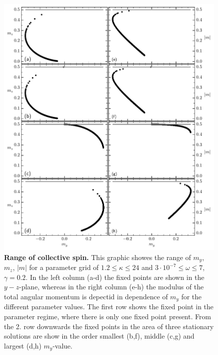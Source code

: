     \begin{figure}[H]
        \hspace*{-0.4cm}
        \includegraphics[scale=0.97]{pictures/fixp_boundaries.pdf}
        \caption{\textbf{Range of collective spin.} This graphic showes the range of $m_y$, $m_z$, $|m|$ for a parameter grid of $1.2\leq\kappa\leq24$ and $3\cdot10^{-7}\leq\omega\leq7$, $\gamma=0.2$. In the left column (a-d) the fixed points are shown in the $y-z$-plane, whereas in the right column (e-h) the modulus of the total angular momentum is depectid in dependence of $m_y$ for the different parameter values. The first row shows the fixed point in the parameter regime, where there is only one fixed point present. From the 2. row downwards the fixed points in the area of three stationary solutions are show in the order smallest (b,f), middle (c,g) and largest (d,h) $m_y$-value.}
    \end{figure}
    
    
    
